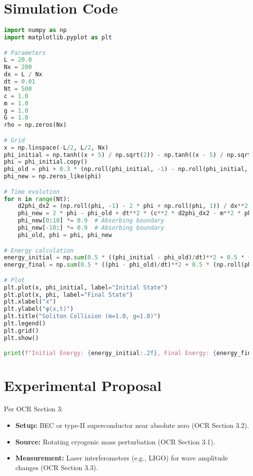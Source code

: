 \documentclass{article}
\begin{document}
\section{Simulation Code}
\begin{lstlisting}[language=Python, caption=Soliton Collision Simulation, label=lst:soliton]
import numpy as np
import matplotlib.pyplot as plt

# Parameters
L = 20.0
Nx = 200
dx = L / Nx
dt = 0.01
Nt = 500
c = 1.0
m = 1.0
g = 1.0
G = 1.0
rho = np.zeros(Nx)

# Grid
x = np.linspace(-L/2, L/2, Nx)
phi_initial = np.tanh((x + 5) / np.sqrt(2)) - np.tanh((x - 5) / np.sqrt(2))
phi = phi_initial.copy()
phi_old = phi + 0.3 * (np.roll(phi_initial, -1) - np.roll(phi_initial, 1)) / (2 * dx) * dt  # v1=0.3, v2=-0.3
phi_new = np.zeros_like(phi)

# Time evolution
for n in range(Nt):
    d2phi_dx2 = (np.roll(phi, -1) - 2 * phi + np.roll(phi, 1)) / dx**2  # Periodic base
    phi_new = 2 * phi - phi_old + dt**2 * (c**2 * d2phi_dx2 - m**2 * phi - g * phi**3 + 8 * np.pi * G * rho)
    phi_new[0:10] *= 0.9  # Absorbing boundary
    phi_new[-10:] *= 0.9  # Absorbing boundary
    phi_old, phi = phi, phi_new

# Energy calculation
energy_initial = np.sum(0.5 * ((phi_initial - phi_old)/dt)**2 + 0.5 * (np.roll(phi_initial, -1) - phi_initial)/dx**2 + 0.5 * m**2 * phi_initial**2 + 0.25 * g * phi_initial**4)
energy_final = np.sum(0.5 * ((phi - phi_old)/dt)**2 + 0.5 * (np.roll(phi, -1) - phi)/dx**2 + 0.5 * m**2 * phi**2 + 0.25 * g * phi**4)

# Plot
plt.plot(x, phi_initial, label="Initial State")
plt.plot(x, phi, label="Final State")
plt.xlabel("x")
plt.ylabel("φ(x,t)")
plt.title("Soliton Collision (m=1.0, g=1.0)")
plt.legend()
plt.grid()
plt.show()

print(f"Initial Energy: {energy_initial:.2f}, Final Energy: {energy_final:.2f}, Change: {100 * (energy_initial - energy_final) / energy_initial:.2f}%")
\end{lstlisting}

\section{Experimental Proposal}
Per OCR Section 3:
\begin{itemize}
    \item \textbf{Setup:} BEC or type-II superconductor near absolute zero (OCR Section 3.2).
    \item \textbf{Source:} Rotating cryogenic mass perturbation (OCR Section 3.1).
    \item \textbf{Measurement:} Laser interferometers (e.g., LIGO) for wave amplitude changes (OCR Section 3.3).
\end{itemize}
\end{document}
